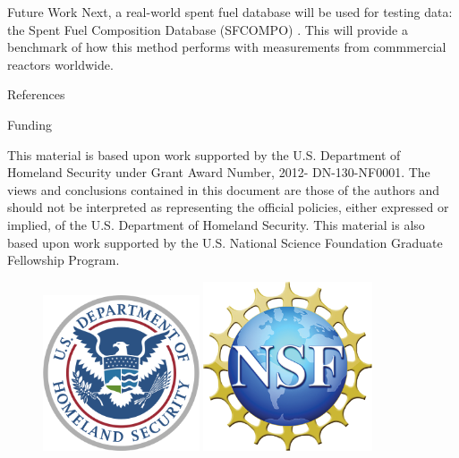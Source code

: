 \documentclass{beamer}
\begin{document}
\begin{frame}[t]{}
\begin{columns}
\begin{column}[T]{0.72\textwidth}
\begin{columns}[t]
\begin{column}{0.4\textwidth}
\begin{block}{Future Work}
Next, a real-world spent fuel database will be used for testing data: the Spent
Fuel Composition Database (SFCOMPO) \cite{sfcompo}. This will provide a
benchmark of how this method performs with measurements from commmercial
reactors worldwide. 

\end{block}

\begin{block}{References}
\printbibliography
\end{block}

\begin{block}{Funding}

\begin{minipage}{.75\textwidth}
\footnotesize
This material is based upon work supported by the U.S. Department of Homeland
Security under Grant Award Number, 2012- DN-130-NF0001. The views and
conclusions contained in this document are those of the authors and should not
be interpreted as representing the official policies, either expressed or
implied, of the U.S. Department of Homeland Security. This material is also
based upon work supported by the U.S. National Science Foundation Graduate
Fellowship Program.
\end{minipage}%
\begin{minipage}{.25\textwidth}
\begin{figure}
  \centering
  \includegraphics[height=4.6cm]{logos/dhs.png}
  \includegraphics[height=5.0cm]{logos/nsf.png}
\end{figure}
\end{minipage}

\end{block}

\end{column}
\end{columns}
\end{column}
\end{columns}
\end{frame}
\end{document}
